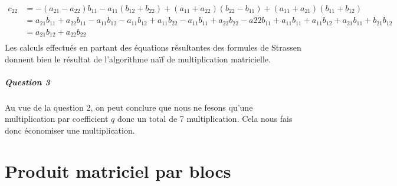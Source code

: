 \documentclass[a4paper,10pt,margin=2in]{report}
\begin{document}
\bigskip
\begin{align*}
c_{22} &= -(a_{21} - a_{22})b_{11} - a_{11}(b_{12} + b_{22}) + (a_{11} + a_{22})(b_{22} - b_{11}) + (a_{11} + a_{21})(b_{11} + b_{12})\\
&= a_{21}b_{11} + a_{22}b_{11} - a_{11}b_{12} - a_{11}b_{12} + a_{11}b_{22} - a_{11}b_{11} + a_{22}b_{22} - a{22}b_{11} + a_{11}b_{11} + a_{11}b_{12} + a_{21}b_{11} + b_{21}b_{12}\\
&= a_{21}b_{12} + a_{22}b_{22}\\
\end{align*}
Les calculs effectués en partant des équations résultantes des formules de Strassen donnent bien le résultat de l'algorithme naïf de multiplication matricielle.

\paragraph{Question 3}
Au vue de la question 2, on peut conclure que nous ne fesons qu'une multiplication par coefficient $q$ donc un total de 7 multiplication. Cela nous fais donc économiser une multiplication. 

\chapter{Produit matriciel par blocs}
\end{document}
